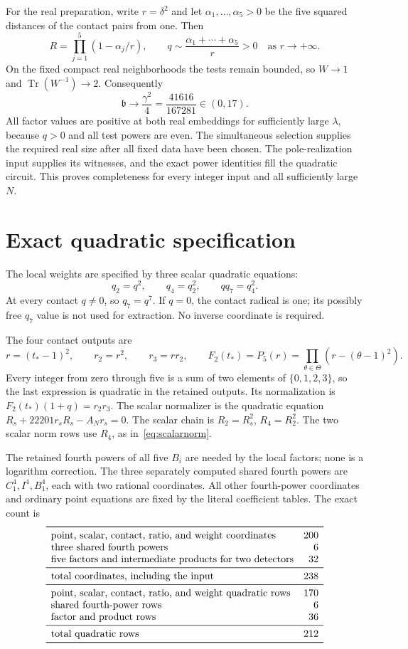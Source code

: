 \documentclass[11pt,a4paper]{article}
\DeclareMathOperator{\Tr}{Tr}\DeclareMathOperator{\Nm}{Nm}
\begin{document}
For the real preparation, write $r=\delta^2$ and let
$\alpha_1,\ldots,\alpha_5>0$ be the five squared distances of the
contact pairs from one. Then
\[
 R=\prod_{j=1}^{5}(1-\alpha_j/r),\qquad
 q\sim\frac{\alpha_1+\cdots+\alpha_5}r>0
 \quad\text{as }r\longrightarrow+\infty.
\]
On the fixed compact real neighborhoods the tests remain bounded, so
$W\to1$ and $\Tr(W^{-1})\to2$. Consequently
\[
              \mathfrak b\longrightarrow\frac{\gamma^2}{4}
                              =\frac{41616}{167281}\in(0,17).
\]
All factor values are positive at both real embeddings for sufficiently
large $\lambda$, because $q>0$ and all test powers are even.
The simultaneous selection supplies the required real size after all
fixed data have been chosen. The pole-realization input supplies its
witnesses, and the exact power identities fill the quadratic circuit.
This proves completeness for every integer input and all sufficiently large $N$.

\section{Exact quadratic specification}
The local weights are specified by three scalar quadratic equations:
\[
                     q_2=q^2,\qquad q_4=q_2^2,\qquad qq_7=q_4^2.
\]
At every contact $q\ne0$, so $q_7=q^7$. If $q=0$, the contact
radical is one; its possibly free $q_7$ value is not used for extraction.
No inverse coordinate is required.

The four contact outputs are
\[
 r=(t_*-1)^2,\qquad r_2=r^2,\qquad r_3=rr_2,\qquad
 F_2(t_*)=P_5(r)=\prod_{\theta\in\Theta}(r-(\theta-1)^2).
\]
Every integer from zero through five is a sum of two elements of
$\{0,1,2,3\}$, so the last expression is quadratic in the retained
outputs. Its normalization is $F_2(t_*)(1+q)=r_2r_3$.
The scalar normalizer is the quadratic equation
$R_s+22201r_sR_s-A_Nr_s=0$.
The scalar chain is $R_2=R_s^2$, $R_4=R_2^2$.
The two scalar norm rows use $R_4$, as in~\eqref{eq:scalarnorm}.

The retained fourth powers of all five $B_i$ are needed by the
local factors; none is a logarithm correction. The three separately
computed shared fourth powers are $C_1^4,I^4,B_1^4$, each with two
rational coordinates. All other fourth-power coordinates and ordinary
point equations are fixed by the literal coefficient tables.
The exact count is
\[
\begin{array}{lr}\toprule
\text{point, scalar, contact, ratio, and weight coordinates}&200\\
\text{three shared fourth powers}&6\\
\text{five factors and intermediate products for two detectors}&32\\\midrule
\text{total coordinates, including the input}&238\\\midrule
\text{point, scalar, contact, ratio, and weight quadratic rows}&170\\
\text{shared fourth-power rows}&6\\
\text{factor and product rows}&36\\\midrule
\text{total quadratic rows}&212\\\bottomrule
\end{array}
\]
\end{document}
